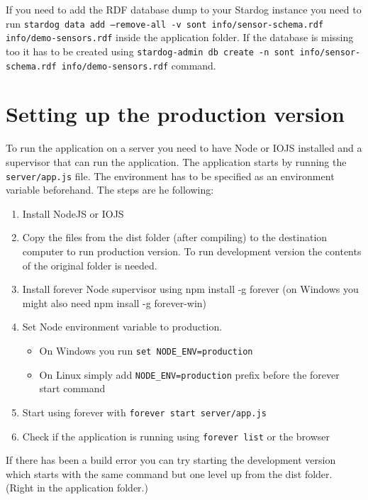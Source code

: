 If you need to add the RDF database dump to your Stardog instance you need to run \texttt{stardog data add --remove-all -v sont info/sensor-schema.rdf info/demo-sensors.rdf} inside the application folder. If the database is missing too it has to be created using \texttt{stardog-admin db create -n sont info/sensor-schema.rdf info/demo-sensors.rdf} command.

\section{Setting up the production version}

To run the application on a server you need to have Node or IOJS installed and a supervisor that can run the application. The application starts by running the \texttt{server/app.js} file. The environment has to be specified as an environment variable beforehand. The steps are he following:
\begin{enumerate}
\item Install NodeJS or IOJS
\item Copy the files from the dist folder (after compiling) to the destination computer to run production version. To run development version the contents of the original folder is needed.
\item Install forever Node supervisor using npm install -g forever (on Windows you might also need npm insall -g forever-win)
\item Set Node environment variable to production.
\begin{itemize}
\item On Windows you run \texttt{set NODE\_ENV=production}
\item On Linux simply add \texttt{NODE\_ENV=production} prefix before the forever start command
\end{itemize}
\item Start using forever with \texttt{forever start server/app.js}
\item Check if the application is running using \texttt{forever list} or the browser
\end{enumerate}
If there has been a build error you can try starting the development version which starts with the same command but one level up from the dist folder. (Right in the application folder.)
\newpage
